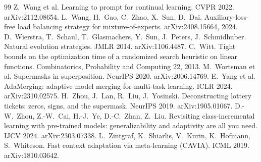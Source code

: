 \documentclass[11pt,a4paper]{article}
\theoremstyle{definition}
\theoremstyle{plain}
\theoremstyle{remark}
\begin{document}
\begin{thebibliography}{99}
 Z.~Wang et al. Learning to prompt for continual learning. CVPR 2022. arXiv:2112.08654.
 L.~Wang, H.~Gao, C.~Zhao, X.~Sun, D.~Dai. Auxiliary-loss-free load balancing strategy for mixture-of-experts. arXiv:2408.15664, 2024.
 D.~Wierstra, T.~Schaul, T.~Glasmachers, Y.~Sun, J.~Peters, J.~Schmidhuber. Natural evolution strategies. JMLR 2014. arXiv:1106.4487.
 C.~Witt. Tight bounds on the optimization time of a randomized search heuristic on linear functions. Combinatorics, Probability and Computing 22, 2013.
 M.~Wortsman et al. Supermasks in superposition. NeurIPS 2020. arXiv:2006.14769.
 E.~Yang et al. AdaMerging: adaptive model merging for multi-task learning. ICLR 2024. arXiv:2310.02575.
 H.~Zhou, J.~Lan, R.~Liu, J.~Yosinski. Deconstructing lottery tickets: zeros, signs, and the supermask. NeurIPS 2019. arXiv:1905.01067.
 D.-W.~Zhou, Z.-W.~Cai, H.-J.~Ye, D.-C.~Zhan, Z.~Liu. Revisiting class-incremental learning with pre-trained models: generalizability and adaptivity are all you need. IJCV 2024. arXiv:2303.07338.
 L.~Zintgraf, K.~Shiarlis, V.~Kurin, K.~Hofmann, S.~Whiteson. Fast context adaptation via meta-learning (CAVIA). ICML 2019. arXiv:1810.03642.
\end{thebibliography}
\end{document}
